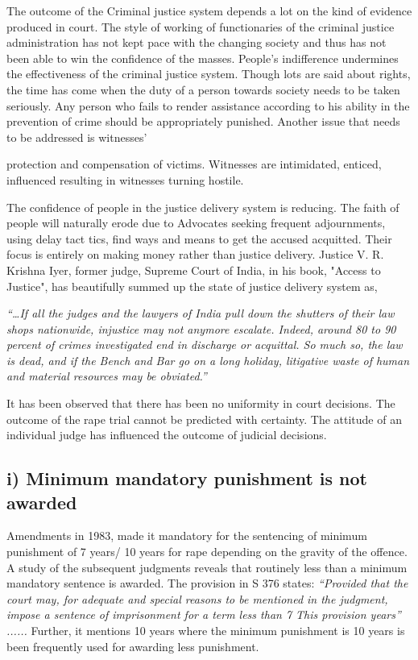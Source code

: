 \begin{multicols}{2}
\noi
The outcome of the Criminal justice system depends a lot on the kind of evidence
produced in court. The style of working of functionaries of the criminal justice
administration has not kept pace with the changing society and thus has not been able
to win the confidence of the masses. People's indifference undermines the effectiveness
of the criminal justice system. Though lots are said about rights, the time has come
when the duty of a person towards society needs to be taken seriously. Any person who
fails to render assistance according to his ability in the prevention of crime should be
appropriately punished. Another issue that needs to be addressed is witnesses'

\noi
protection and compensation of victims. Witnesses are intimidated, enticed, influenced
resulting in witnesses turning hostile.

\noi
The confidence of people in the justice delivery system is reducing. The faith of people
will naturally erode due to Advocates seeking frequent adjournments, using delay tact
tics, find ways and means to get the accused acquitted. Their focus is entirely on making
money rather than justice delivery. Justice V. R. Krishna Iyer, former judge, Supreme
Court of India, in his book, "Access to Justice", has beautifully summed up the state of
justice delivery system as,

\noi
\textit{“…If all the judges and the lawyers of India pull down the shutters of their law shops
nationwide, injustice may not anymore escalate. Indeed, around 80 to 90 percent of
crimes investigated end in discharge or acquittal. So much so, the law is dead, and if
the Bench and Bar go on a long holiday, litigative waste of human and material
resources may be obviated.”}


\noi
It has been observed that there has been no uniformity in court decisions. The outcome
of the rape trial cannot be predicted with certainty. The attitude of an individual judge
has influenced the outcome of judicial decisions.

\subsection*{i) Minimum mandatory punishment is not awarded}

\noi
Amendments in 1983, made it mandatory for the sentencing of minimum punishment
of 7 years/ 10 years for rape depending on the gravity of the offence. A study of the
subsequent judgments reveals that routinely less than a minimum mandatory sentence
is awarded. The provision in S 376 states: \textit{“Provided that the court may, for adequate
and special reasons to be mentioned in the judgment, impose a sentence of
imprisonment for a term less than 7 This provision years” ......} Further, it mentions 10
years where the minimum punishment is 10 years is been frequently used for awarding
less punishment.


\end{multicols}
